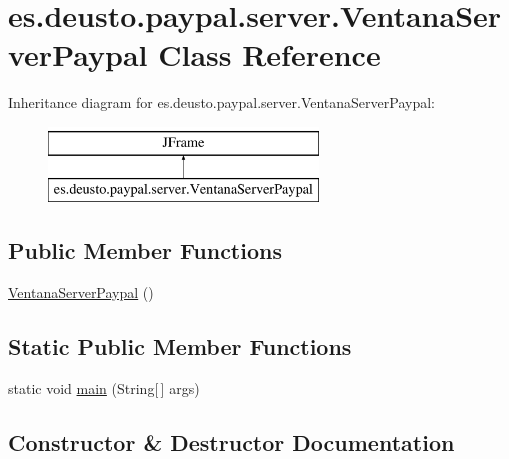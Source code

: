 \hypertarget{classes_1_1deusto_1_1paypal_1_1server_1_1_ventana_server_paypal}{}\section{es.\+deusto.\+paypal.\+server.\+Ventana\+Server\+Paypal Class Reference}
\label{classes_1_1deusto_1_1paypal_1_1server_1_1_ventana_server_paypal}
Inheritance diagram for es.\+deusto.\+paypal.\+server.\+Ventana\+Server\+Paypal\+:\begin{figure}[H]
\begin{center}
\leavevmode
\includegraphics[height=2.000000cm]{classes_1_1deusto_1_1paypal_1_1server_1_1_ventana_server_paypal}
\end{center}
\end{figure}
\subsection*{Public Member Functions}
\begin{DoxyCompactItemize}
\item 
\mbox{\hyperlink{classes_1_1deusto_1_1paypal_1_1server_1_1_ventana_server_paypal_ac144e15cc83df92eb8b95f2e664a3ea3}{Ventana\+Server\+Paypal}} ()
\end{DoxyCompactItemize}
\subsection*{Static Public Member Functions}
\begin{DoxyCompactItemize}
\item 
static void \mbox{\hyperlink{classes_1_1deusto_1_1paypal_1_1server_1_1_ventana_server_paypal_ae060e72a63cc631513f054ceb6321a4f}{main}} (String\mbox{[}$\,$\mbox{]} args)
\end{DoxyCompactItemize}


\subsection{Constructor \& Destructor Documentation}
\mbox{\label{classes_1_1deusto_1_1paypal_1_1server_1_1_ventana_server_paypal_ac144e15cc83df92eb8b95f2e664a3ea3}} 
